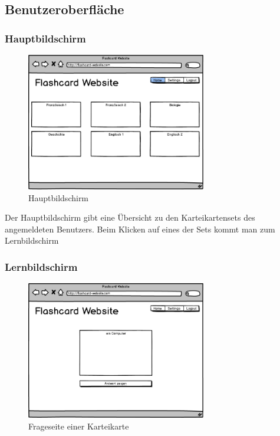 \subsection{Benutzeroberfläche}
\subsubsection{Hauptbildschirm}

\begin{figure}[H]
    \centering
    \includegraphics[width=0.7\textwidth]{images/Overview.png}
    \caption{Hauptbildschirm}
    \label{fig:overview}
\end{figure}

Der Hauptbildschirm gibt eine Übersicht zu den Karteikartensets des angemeldeten Benutzers. Beim Klicken auf eines der Sets kommt man zum Lernbildschirm


\subsubsection{Lernbildschirm}


\begin{figure}[H]
    \centering
    \includegraphics[width=0.7\textwidth]{images/Lernscreen-Frage.png}
    \caption{Frageseite einer Karteikarte}
    \label{fig:lernscreen-frage}
\end{figure}

